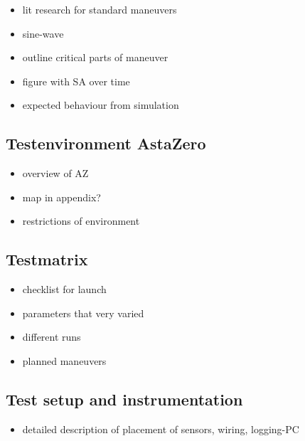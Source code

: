 \documentclass[ExampleMasters.tex]{subfiles}
\begin{document}
\begin{itemize}
	\item lit research for standard maneuvers
	\item sine-wave
	\item outline critical parts of maneuver
	\item figure with SA over time
	\item expected behaviour from simulation
\end{itemize}

\subsection{Testenvironment AstaZero}

\begin{itemize}
	\item overview of AZ
	\item map in appendix?
	\item restrictions of environment
	
\end{itemize}

\subsection{Testmatrix}

\begin{itemize}
	\item checklist for launch
	\item parameters that very varied
	\item different runs
	\item planned maneuvers
	
\end{itemize}

\subsection{Test setup and instrumentation}

\begin{itemize}
	\item detailed description of placement of sensors, wiring, logging-PC
\end{itemize}
\end{document}
